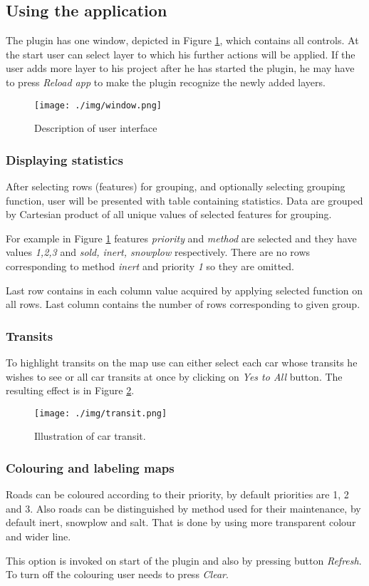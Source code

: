 \documentclass[12pt,a4paper]{article}
\begin{document}
\subsection{Using the application}
The plugin has one window, depicted in Figure \ref{window}, which contains all controls.
At the start user can select layer to which his further actions will be applied.
If the user adds more layer to his project after he has started the plugin, he may have to press \emph{Reload app} to make the plugin recognize the newly added layers.

\begin{figure}[H]\centering
\texttt{[image: ./img/window.png]}
\caption{Description of user interface}
\label{window}
\end{figure}

\subsubsection{Displaying statistics}
After selecting rows (features) for grouping, and optionally selecting grouping function, user will be presented with table containing statistics.
Data are grouped by Cartesian product of all unique values of selected features for grouping. 

\par For example in Figure \ref{window} features \emph{priority} and \emph{method} are selected and they have values \emph{1,2,3} and \emph{sold, inert, snowplow} respectively.
There are no rows corresponding to method \emph{inert} and priority \emph{1} so they are omitted.

\par Last row contains in each column value acquired by applying selected function on all rows.
Last column contains the number of rows corresponding to given group.

\subsubsection{Transits}
To highlight transits on the map use can either select each car whose transits he wishes to see or all car transits at once by clicking on \emph{Yes to All} button.
The resulting effect is in Figure \ref{transit}.

\begin{figure}[H]\centering
\texttt{[image: ./img/transit.png]}
\caption{Illustration of car transit.}
\label{transit}
\end{figure}

\subsubsection{Colouring and labeling maps}
Roads can be coloured according to their priority, by default priorities are 1, 2 and 3. 
Also roads can be distinguished by method used for their maintenance, by default inert, snowplow and salt. 
That is done by using more transparent colour and wider line.
\par This option is invoked on start of the plugin and also by pressing button \emph{Refresh}.
To turn off the colouring user needs to press \emph{Clear}.
\end{document}
